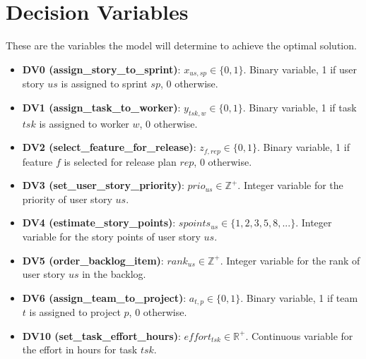 \documentclass[11pt]{article}
\begin{document}
\section{Decision Variables}
These are the variables the model will determine to achieve the optimal solution.
\begin{itemize}
    \item \textbf{DV0 (assign\_story\_to\_sprint)}: $x_{us, sp} \in \{0, 1\}$. Binary variable, 1 if user story $us$ is assigned to sprint $sp$, 0 otherwise.
    \item \textbf{DV1 (assign\_task\_to\_worker)}: $y_{tsk, w} \in \{0, 1\}$. Binary variable, 1 if task $tsk$ is assigned to worker $w$, 0 otherwise.
    \item \textbf{DV2 (select\_feature\_for\_release)}: $z_{f, rep} \in \{0, 1\}$. Binary variable, 1 if feature $f$ is selected for release plan $rep$, 0 otherwise.
    \item \textbf{DV3 (set\_user\_story\_priority)}: $prio_{us} \in \mathbb{Z}^+$. Integer variable for the priority of user story $us$.
    \item \textbf{DV4 (estimate\_story\_points)}: $spoints_{us} \in \{1,2,3,5,8,...\}$. Integer variable for the story points of user story $us$.
    \item \textbf{DV5 (order\_backlog\_item)}: $rank_{us} \in \mathbb{Z}^+$. Integer variable for the rank of user story $us$ in the backlog.
    \item \textbf{DV6 (assign\_team\_to\_project)}: $a_{t, p} \in \{0, 1\}$. Binary variable, 1 if team $t$ is assigned to project $p$, 0 otherwise.
    \item \textbf{DV10 (set\_task\_effort\_hours)}: $effort_{tsk} \in \mathbb{R}^+$. Continuous variable for the effort in hours for task $tsk$.
\end{itemize}
\newpage
\end{document}
